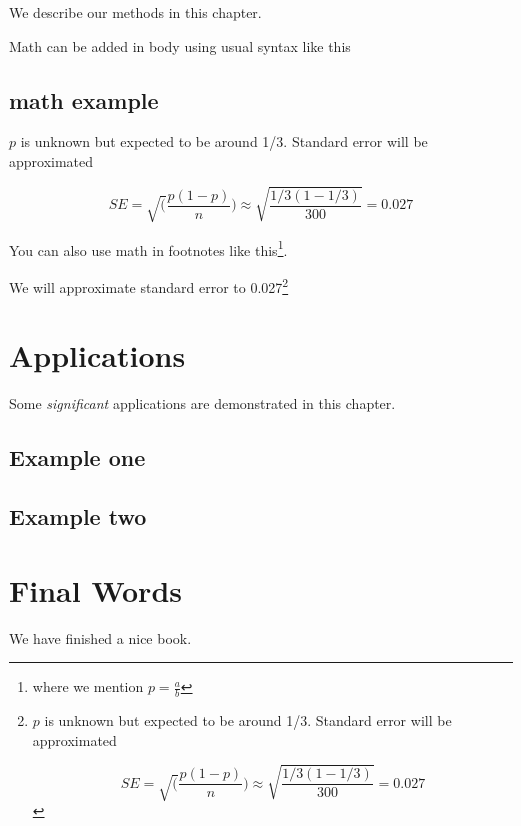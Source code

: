 \documentclass[
]{book}
\begin{document}
We describe our methods in this chapter.

Math can be added in body using usual syntax like this

\hypertarget{math-example}{%
\section{math example}\label{math-example}}

\(p\) is unknown but expected to be around 1/3. Standard error will be approximated

\[
SE = \sqrt(\frac{p(1-p)}{n}) \approx \sqrt{\frac{1/3 (1 - 1/3)} {300}} = 0.027
\]

You can also use math in footnotes like this\footnote{where we mention \(p = \frac{a}{b}\)}.

We will approximate standard error to 0.027\footnote{\(p\) is unknown but expected to be around 1/3. Standard error will be approximated

  \[
  SE = \sqrt(\frac{p(1-p)}{n}) \approx \sqrt{\frac{1/3 (1 - 1/3)} {300}} = 0.027
  \]}

\hypertarget{applications}{%
\chapter{Applications}\label{applications}}

Some \emph{significant} applications are demonstrated in this chapter.

\hypertarget{example-one}{%
\section{Example one}\label{example-one}}

\hypertarget{example-two}{%
\section{Example two}\label{example-two}}

\hypertarget{final-words}{%
\chapter{Final Words}\label{final-words}}

We have finished a nice book.

  
\end{document}
